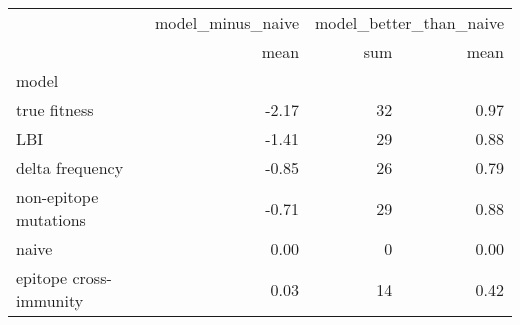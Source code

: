 \begin{tabular}{lrrr}
\toprule
{} & model\_minus\_naive & \multicolumn{2}{l}{model\_better\_than\_naive} \\
{} &              mean &                     sum & mean \\
model                  &                   &                         &      \\
\midrule
true fitness           &             -2.17 &                      32 & 0.97 \\
LBI                    &             -1.41 &                      29 & 0.88 \\
delta frequency        &             -0.85 &                      26 & 0.79 \\
non-epitope mutations  &             -0.71 &                      29 & 0.88 \\
naive                  &              0.00 &                       0 & 0.00 \\
epitope cross-immunity &              0.03 &                      14 & 0.42 \\
\bottomrule
\end{tabular}
